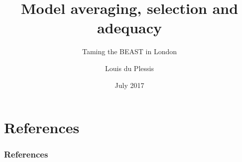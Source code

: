 \documentclass[xcolor=pdftex,dvipsnames,table,10pt]{beamer}
\author[]{Louis du Plessis}
\institute{Department of Zoology, University of Oxford}
\title[Model averaging]{Model averaging, selection and adequacy}
\subtitle{Taming the BEAST in London}
\date{July 2017}
\begin{document}
\begin{frame}
  \titlepage
\end{frame}



\section{References}
\begin{frame}[t,allowframebreaks]\frametitle{References}

\tiny
\end{frame}
\end{document}
